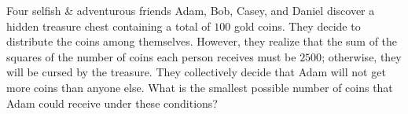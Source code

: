 Four selfish \& adventurous friends Adam, Bob, Casey, and Daniel discover a hidden treasure chest containing a total of $100$ gold coins. They decide to distribute the coins among themselves. However, they realize that the sum of the squares of the number of coins each person receives must be $2500$; otherwise, they will be cursed by the treasure. They collectively decide that Adam will not get more coins than anyone else. What is the smallest possible number of coins that Adam could receive under these conditions?
